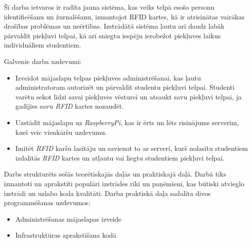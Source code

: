 Šī darba ietvaros ir radīta jauna sistēma, kas veiks telpā esošo personu identificēšanu un žurnalēšanu, izmantojot RFID kartes, kā ir atrisinātas vairākas drošības problēmas un neērtības. Izstrādātā sistēma ļautu arī daudz labāk pārvaldīt piekļuvi telpai, kā arī sniegtu iespēju ierobežot piekļuves laikus individuāliem studentiem.

Galvenie darba uzdevumi:
\begin{itemize}
  \item Izveidot mājaslapu telpas piekļuves administrēšanai, kas ļautu administratoram autorizēt un pārvaldīt studentu piekļuvi telpai. Studenti varētu sekot līdzi savai piekļuves vēsturei un atsaukt savu piekļuvi telpai, ja gadījies savu \textit{RFID} kartes nozaudēt.
  \item Uzstādīt mājaslapu uz \textit{RaspberryPi}, kas ir ērts un lēts risinājums serverim, kurš veic vienkāršu uzdevumu.
  \item Imitēt \textit{RFID} karšu lasītāju un savienot to ar serveri, kurš nolasītu studentiem izdalītās \textit{RFID} kartes un atļautu vai liegtu studentiem piekļuvi telpai.
\end{itemize}

Darbs strukturēts sešās teorētiskajās daļās un praktiskajā daļā.
Darbā tiks izmantoti un aprakstīti populāri izstrādes rīki un paņēmieni, kas būtiski atvieglo izstrādi un uzlabo koda kvalitāti.
Darba praktiskā daļa sadalīta divos programmēšanas uzdevumos:
\begin{itemize}
  \item Administrēšanas mājaslapas izveide
  \item Infrastruktūras aprakstīšana kodā
\end{itemize}


